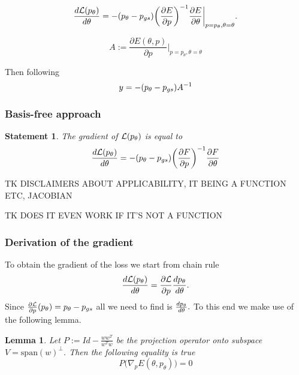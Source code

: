 \documentclass[a4paper,10pt]{report}
\newtheorem{statement}{Statement}
\newtheorem{lemma}{Lemma}
\begin{document}
\begin{equation}
 \frac{d\mathcal{L}(p_\theta)}{d \theta} = - (p_\theta - p_{gs})\bigg(\frac{\partial E}{\partial p}\bigg)^{-1}  \frac{\partial E}{\partial \theta}\bigg|_{p=p_\theta, \theta=\theta}.
\end{equation}

\begin{equation}
 A := \frac{\partial E(\theta, p)}{\partial p}\bigg|_{p=p_\theta, \theta=\theta}
\end{equation}

Then following \cite{neuralscf}
\begin{equation}
 y = -(p_\theta-p_{gs})A^{-1}
\end{equation}

\subsubsection{Basis-free approach}
\begin{statement}
The gradient of $\mathcal{L}(p_\theta)$ is equal to
 \begin{equation}
 \frac{d\mathcal{L}(p_\theta)}{d \theta} = -(p_\theta - p_{gs}) \bigg(\frac{\partial F}{\partial p}\bigg)^{-1}  \frac{\partial F}{\partial \theta}
\end{equation}
\end{statement}


TK DISCLAIMERS ABOUT APPLICABILITY, IT BEING A FUNCTION ETC, JACOBIAN

TK DOES IT EVEN WORK IF IT'S NOT A FUNCTION
\subsubsection{Derivation of the gradient}
To obtain the gradient of the loss we start from chain rule
\begin{equation}
 \frac{d\mathcal{L}(p_\theta)}{d \theta} = \frac{\partial \mathcal{L}}{\partial p}\frac{dp_\theta}{d \theta}.
\end{equation}
Since $\frac{\partial \mathcal{L}}{\partial p}(p_\theta )= p_\theta-p_{gs}$ all we need to find is $\frac{dp_\theta}{d \theta}.$ To this end we make use of the following lemma.

\begin{lemma}
 Let $P := Id -\frac{ww^T}{w^Tw} $ be the projection operator onto subspace $V = \text{span}(w)^{\perp}$. Then the following equality is true
 \begin{equation}
  P\big(\nabla_p E(\theta, p_\theta)\big) = 0
 \end{equation}

\end{lemma}
\end{document}
